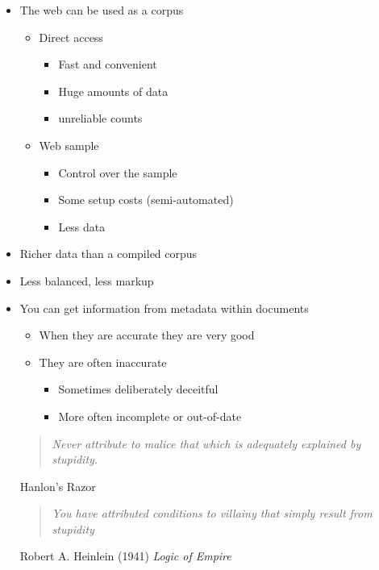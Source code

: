 \documentclass[a4paper,landscape,headrule,footrule,xetex]{foils}
\begin{document}

\MyLogo{}
 
\begin{itemize}
\item The web can be used as a corpus
  \begin{itemize}
  \item Direct access
    \begin{itemize}
    \item Fast and convenient
    \item Huge amounts of data
    \item[\Bad] unreliable counts 
    \end{itemize}
  \item Web sample
    \begin{itemize}
    \item Control over the sample
    \item Some setup costs (semi-automated)
    \item[\Bad] Less data 
    \end{itemize}
  \end{itemize}
\item Richer data than a compiled corpus
\item[\Bad] Less balanced, less markup
\end{itemize}


\MyLogo{}
\begin{itemize}
\item You can get information from metadata within documents
  \begin{itemize}
  \item When they are accurate they are very good
  \item They are often inaccurate
    \begin{itemize}
    \item Sometimes deliberately deceitful
    \item More often incomplete or out-of-date
    \end{itemize}
  \end{itemize}
      \begin{quote} \itshape
    Never attribute to malice that which is adequately explained by stupidity.

     \end{quote} %
      \begin{flushright}
               Hanlon's Razor
      \end{flushright}
      \begin{quote} \itshape
        You have attributed conditions to villainy 
        that simply result from stupidity
      \end{quote}
       \begin{flushright}
         Robert A. Heinlein (1941) \textit{Logic of Empire}
       \end{flushright}
\end{itemize}
\end{document}
